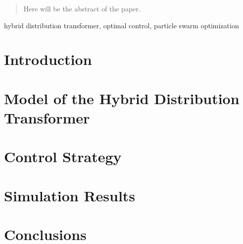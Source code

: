 





\maketitle

\begin{abstract}
Here will be the abstract of the paper.
\end{abstract}

\begin{IEEEkeywords}
    hybrid distribution transformer, optimal control, particle swarm optimization
\end{IEEEkeywords}

\section{Introduction}



\section{Model of the Hybrid Distribution Transformer}



\section{Control Strategy}



\section{Simulation Results}



\section{Conclusions}








